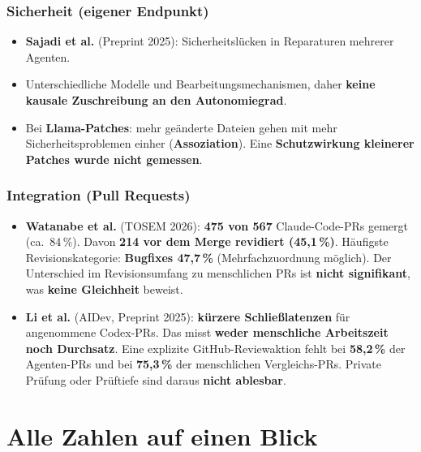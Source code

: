 \documentclass[12pt,a4paper]{article}
\newcommand{\quelle}[1]{\textcolor{grau}{(#1)}}
\begin{document}
\subsubsection*{Sicherheit (eigener Endpunkt)}
\begin{itemize}
  \item \textbf{Sajadi et al.} \quelle{Preprint 2025}: Sicherheitslücken in Reparaturen mehrerer Agenten.
  \item Unterschiedliche Modelle und Bearbeitungsmechanismen, daher \textbf{keine kausale Zuschreibung an den Autonomiegrad}.
  \item Bei \textbf{Llama-Patches}: mehr geänderte Dateien gehen mit mehr Sicherheitsproblemen einher (\textbf{Assoziation}). Eine \textbf{Schutzwirkung kleinerer Patches wurde nicht gemessen}.
\end{itemize}

\subsubsection*{Integration (Pull Requests)}
\begin{itemize}
  \item \textbf{Watanabe et al.} \quelle{TOSEM 2026}: \textbf{475 von 567} Claude-Code-PRs gemergt (ca.\ 84\,\%). Davon \textbf{214 vor dem Merge revidiert (45,1\,\%)}. Häufigste Revisionskategorie: \textbf{Bugfixes 47,7\,\%} (Mehrfachzuordnung möglich). Der Unterschied im Revisionsumfang zu menschlichen PRs ist \textbf{nicht signifikant}, was \textbf{keine Gleichheit} beweist.
  \item \textbf{Li et al.} \quelle{AIDev, Preprint 2025}: \textbf{kürzere Schließlatenzen} für angenommene Codex-PRs. Das misst \textbf{weder menschliche Arbeitszeit noch Durchsatz}. Eine explizite GitHub-Reviewaktion fehlt bei \textbf{58,2\,\%} der Agenten-PRs und bei \textbf{75,3\,\%} der menschlichen Vergleichs-PRs. Private Prüfung oder Prüftiefe sind daraus \textbf{nicht ablesbar}.
\end{itemize}

\section{Alle Zahlen auf einen Blick}
\label{sec:zahlen}
\end{document}
